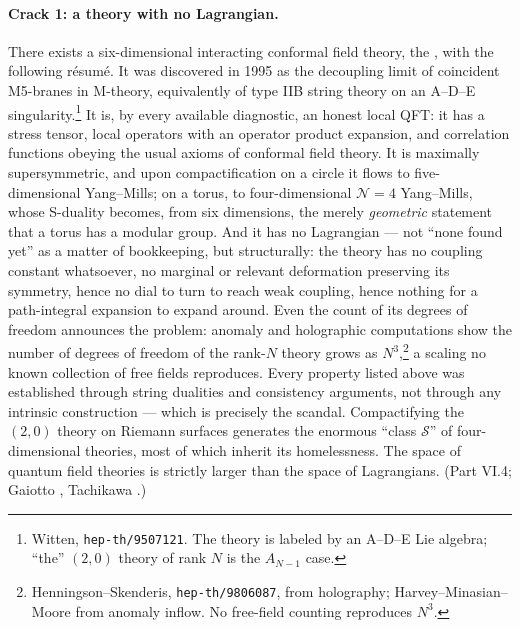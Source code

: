 \paragraph{Crack 1: a theory with no Lagrangian.}
There exists a six-dimensional interacting conformal field theory, the
, with the following r\'esum\'e. It was discovered in 1995 as
the decoupling limit of coincident M5-branes in M-theory, equivalently of type
IIB string theory on an A--D--E singularity.\footnote{Witten,
\texttt{hep-th/9507121}. The theory is labeled by an A--D--E Lie algebra;
``the'' $(2,0)$ theory of rank $N$ is the $A_{N-1}$ case.} It is, by every
available diagnostic, an honest local QFT: it has a stress tensor, local
operators with an operator product expansion, and correlation functions obeying
the usual axioms of conformal field theory. It is maximally supersymmetric, and
upon compactification on a circle it flows to five-dimensional Yang--Mills; on a
torus, to four-dimensional $\mathcal{N}=4$ Yang--Mills, whose S-duality becomes,
from six dimensions, the merely \emph{geometric} statement that a torus has a
modular group. And it has no Lagrangian --- not ``none found yet'' as a matter
of bookkeeping, but structurally: the theory has no coupling constant
whatsoever, no marginal or relevant deformation preserving its symmetry, hence
no dial to turn to reach weak coupling, hence nothing for a path-integral
expansion to expand around. Even the count of its degrees of freedom announces
the problem: anomaly and holographic computations show the number of degrees of
freedom of the rank-$N$ theory grows as $N^3$,\footnote{Henningson--Skenderis,
\texttt{hep-th/9806087}, from holography; Harvey--Minasian--Moore from anomaly
inflow. No free-field counting reproduces $N^3$.} a scaling no known collection
of free fields reproduces. Every property listed above was established through
string dualities and consistency arguments, not through any intrinsic
construction --- which is precisely the scandal. Compactifying the $(2,0)$
theory on Riemann surfaces generates the enormous ``class $\mathcal{S}$'' of
four-dimensional theories, most of which inherit its homelessness. The space of
quantum field theories is strictly larger than the space of Lagrangians. (Part
VI.4; Gaiotto , Tachikawa .)

